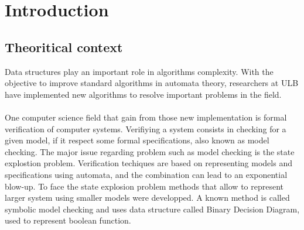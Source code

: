 \documentclass[letterpaper]{article}
\theoremstyle{definition}
\begin{document}
%



\newpage

\tableofcontents

\newpage


\newpage

\section{Introduction}

\subsection{Theoritical context}

Data structures play an important role in algorithms complexity.
With the objective to improve standard algorithms in automata theory,
researchers at ULB
have implemented new algorithms to resolve
important problems in the field.

\paragraph{}

One computer science
field that gain from
those new implementation is formal verification of computer systems.
Verifiying a system consists in checking for a given model, if
it respect some formal specifications,
also known as model checking. The major issue regarding problem
such as model checking is the state explostion problem.
Verification techiques are based on representing
models and specifications using automata, and the combination
can lead to an exponential blow-up. To face the state explosion
problem methods that allow to represent larger system using
smaller models were developped. A known method is called
symbolic model checking and uses data structure called
Binary Decision Diagram, used to represent boolean function.

\paragraph{}
\end{document}
